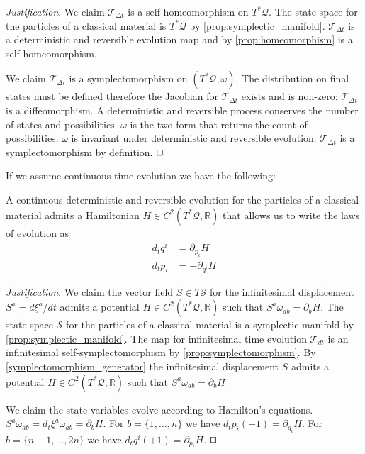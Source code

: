 \documentclass[smallextended]{svjour3}
\numberwithin{equation}{section}
\newenvironment{justification}{\emph{Justification}.}{\hfill\(\qed\)}
\begin{document}
\begin{justification}
	We claim $\mathcal{T}_{\Delta t}$ is a self-homeomorphism on $T^*\mathcal{Q}$. The state space for the particles of a classical material is $T^*\mathcal{Q}$ by \ref{prop:symplectic_manifold}. $\mathcal{T}_{\Delta t}$ is a deterministic and reversible evolution map and by \ref{prop:homeomorphism} is a self-homeomorphism.
	
	We claim $\mathcal{T}_{\Delta t}$ is a symplectomorphism on $(T^*\mathcal{Q}, \omega)$. The distribution on final states must be defined  therefore the Jacobian for $\mathcal{T}_{\Delta t}$ exists and is non-zero: $\mathcal{T}_{\Delta t}$ is a diffeomorphism. A deterministic and reversible process conserves the number of states and possibilities. $\omega$ is the two-form that returns the count of possibilities. $\omega$ is invariant under deterministic and reversible evolution. $\mathcal{T}_{\Delta t}$ is a symplectomorphism by definition.
\end{justification}

If we assume continuous time evolution we have the following:

\begin{prop}\label{prop:hamiltons_equations}
	A continuous deterministic and reversible evolution for the particles of a classical material admits a Hamiltonian $H \in C^2(T^*\mathcal{Q}, \mathbb{R})$ that allows us to write the laws of evolution as
\begin{align*}
d_{t}q^i &= \partial_{p_i} H \\
d_{t}p_i &= - \partial_{q^i} H
\end{align*}
\end{prop}

\begin{justification}
We claim the vector field $S \in T\mathcal{S}$ for the infinitesimal displacement $S^a = d\xi^a/dt$ admits a potential $H \in C^2(T^*\mathcal{Q}, \mathbb{R})$ such that $S^{a} \omega_{ab} = \partial_{b}H$. The state space $\mathcal{S}$ for the particles of a classical material is a symplectic manifold by \ref{prop:symplectic_manifold}. The map for infinitesimal time evolution $\mathcal{T}_{dt}$ is an infinitesimal self-symplectomorphism by \ref{prop:symplectomorphism}. By \ref{symplectomorphism_generator} the infinitesimal displacement $S$ admits a potential $H \in C^2(T^*\mathcal{Q}, \mathbb{R})$ such that $S^{a} \omega_{ab} = \partial_{b}H$

We claim the state variables evolve according to Hamilton's equations. $S^{a} \omega_{ab} = d_t\xi^a \omega_{ab} = \partial_{b}H$. For $b=\{1,...,n\}$ we have $d_tp_i (-1) = \partial_{q_i} H$. For $b=\{n+1,...,2n\}$ we have $d_tq^i (+1) = \partial_{p_i} H$.
\end{justification}
\end{document}
